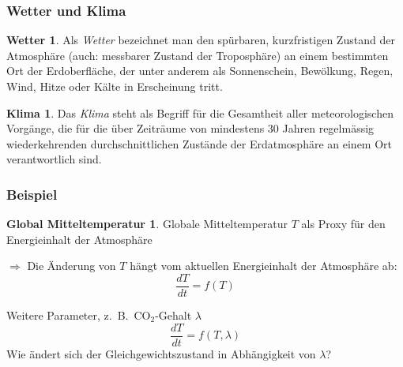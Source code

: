 %
%
%
\theoremstyle{definition}
\newtheorem{wetter}{Wetter}
\newtheorem{klima}{Klima}
\newtheorem{mitteltemperatur}{Global Mitteltemperatur}



\begin{frame}
\frametitle{Wetter und Klima}
\begin{wetter}
Als {\em Wetter} bezeichnet man den
spürbaren, kurzfristigen Zustand der Atmosphäre (auch: messbarer
Zustand der Troposphäre) an einem bestimmten Ort der Erdoberfläche,
der unter anderem als Sonnenschein, Bewölkung, Regen, Wind, Hitze
oder Kälte in Erscheinung tritt.
\end{wetter}
\begin{klima}
Das {\em Klima} steht als Begriff für die Gesamtheit aller meteorologischen
Vorgänge, die für die über Zeiträume von mindestens 30 Jahren
regelmässig wiederkehrenden durchschnittlichen Zustände der Erdatmosphäre
an einem Ort verantwortlich sind.
\end{klima}
\end{frame}

\begin{frame}
\frametitle{Beispiel}
\begin{mitteltemperatur}
Globale Mitteltemperatur $T$ als Proxy für den Energieinhalt der Atmosphäre
\end{mitteltemperatur}

\bigskip

\pause
$\Rightarrow$ Die Änderung von $T$ hängt vom aktuellen Energieinhalt der
Atmosphäre ab:
\[
\frac{dT}{dt}
=
f(T)
\]

\bigskip
\pause
Weitere Parameter, z.~B.~$\text{CO}_2$-Gehalt $\lambda$
\[
\frac{dT}{dt}
=
f(T,\lambda)
\]
Wie ändert sich der Gleichgewichtszustand in Abhängigkeit von $\lambda$?

\end{frame}


